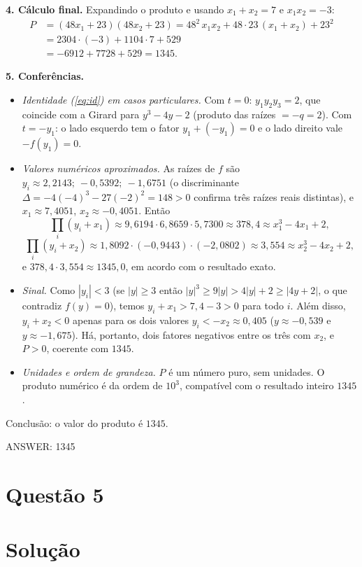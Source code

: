 \documentclass{article}%
\begin{document}
\textbf{4. Cálculo final.} Expandindo o produto e usando $x_1+x_2=7$ e $x_1x_2=-3$:
\begin{align*}
P&=(48x_1+23)(48x_2+23)=48^2\,x_1x_2+48\cdot 23\,(x_1+x_2)+23^2\\
&=2304\cdot(-3)+1104\cdot 7+529\\
&=-6912+7728+529=1345.
\end{align*}

\textbf{5. Conferências.}
\begin{itemize}
\item \emph{Identidade (\ref{eq:id}) em casos particulares.} Com $t=0$: $y_1y_2y_3=2$, que coincide com a Girard para $y^3-4y-2$ (produto das raízes $=-q=2$). Com $t=-y_1$: o lado esquerdo tem o fator $y_1+(-y_1)=0$ e o lado direito vale $-f(y_1)=0$.
\item \emph{Valores numéricos aproximados.} As raízes de $f$ são $y_i\approx 2{,}2143;\ -0{,}5392;\ -1{,}6751$ (o discriminante $\Delta=-4(-4)^3-27(-2)^2=148>0$ confirma três raízes reais distintas), e $x_1\approx 7{,}4051$, $x_2\approx -0{,}4051$. Então
\[
\prod_{i}(y_i+x_1)\approx 9{,}6194\cdot 6{,}8659\cdot 5{,}7300\approx 378{,}4 \approx x_1^3-4x_1+2,
\]
\[
\prod_{i}(y_i+x_2)\approx 1{,}8092\cdot(-0{,}9443)\cdot(-2{,}0802)\approx 3{,}554 \approx x_2^3-4x_2+2,
\]
e $378{,}4\cdot 3{,}554\approx 1345{,}0$, em acordo com o resultado exato.
\item \emph{Sinal.} Como $|y_i|<3$ (se $|y|\ge 3$ então $|y|^3\ge 9|y|>4|y|+2\ge|4y+2|$, o que contradiz $f(y)=0$), temos $y_i+x_1>7{,}4-3>0$ para todo $i$. Além disso, $y_i+x_2<0$ apenas para os dois valores $y_i<-x_2\approx 0{,}405$ ($y\approx -0{,}539$ e $y\approx -1{,}675$). Há, portanto, dois fatores negativos entre os três com $x_2$, e $P>0$, coerente com $1345$.
\item \emph{Unidades e ordem de grandeza.} $P$ é um número puro, sem unidades. O produto numérico é da ordem de $10^3$, compatível com o resultado inteiro $1345$.
\end{itemize}

Conclusão: o valor do produto é $1345$.

ANSWER: 1345%
\newpage%
\section*{Questão 5}

\section*{Solução}
\end{document}
